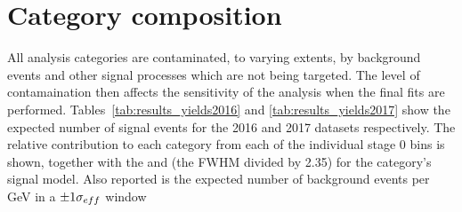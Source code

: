 \section{Category composition}

All analysis categories are contaminated, to varying extents, 
by background events and other signal processes which are not being targeted.
The level of contamaination then affects the sensitivity of the analysis 
when the final fits are performed.
Tables~\ref{tab:results_yields2016} and \ref{tab:results_yields2017} 
show the expected number of signal events for the 2016 and 2017 datasets respectively.
The relative contribution to each category from each of the individual stage 0 bins is shown, 
together with the \seff and \shm (the FWHM divided by 2.35) for the category's signal model.
Also reported is the expected number of background events per GeV in a $\pm1\sigma_{eff}$ window 
